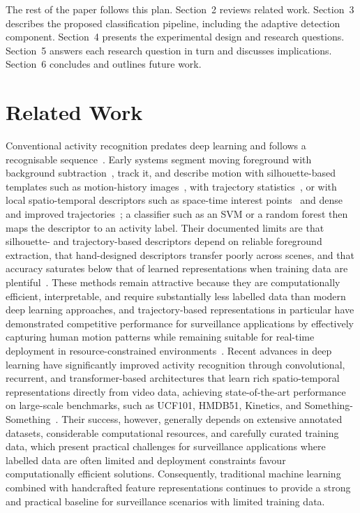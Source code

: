 \documentclass[runningheads]{llncs}
\begin{document}
The rest of the paper follows this plan. Section~2 reviews related work. Section~3 
describes the proposed classification pipeline, including the adaptive detection 
component. Section~4 presents the experimental design and research questions. 
Section~5 answers each research question in turn and discusses implications. 
Section~6 concludes and outlines future work.

\section{Related Work}

Conventional activity recognition predates deep learning and follows a recognisable 
sequence~\cite{aggarwal2011human,poppe2010survey}. Early systems segment moving 
foreground with background subtraction~\cite{stauffer1999adaptive,zivkovic2004improved}, 
track it, and describe motion with silhouette-based templates such as motion-history 
images~\cite{bobick2002recognition}, with trajectory statistics~\cite{ahmed2018trajectory}, 
or with local spatio-temporal descriptors such as space-time interest 
points~\cite{laptev2005space} and dense and improved 
trajectories~\cite{wang2012dense,wang2013improved}; a classifier such as an SVM or a 
random forest then maps the descriptor to an activity label. Their documented limits are 
that silhouette- and trajectory-based descriptors depend on reliable foreground 
extraction, that hand-designed descriptors transfer poorly across scenes, and that 
accuracy saturates below that of learned representations when training data are 
plentiful~\cite{ur2023use,xiao2016overview}. These methods 
remain attractive because they are computationally efficient, interpretable, and require 
substantially less labelled data than modern deep learning approaches, and trajectory-based 
representations in particular have demonstrated competitive performance for surveillance 
applications by effectively capturing human motion patterns while remaining suitable for 
real-time deployment in resource-constrained environments~\cite{ahmed2018trajectory,csurka2018handcrafted}. 
Recent advances in deep learning have significantly improved activity recognition through 
convolutional, recurrent, and transformer-based architectures that learn rich spatio-temporal 
representations directly from video data, achieving state-of-the-art performance on large-scale 
benchmarks, such as UCF101, HMDB51, Kinetics, and Something-Something~\cite{ur2023use,xiao2016overview}. 
Their success, however, generally depends on extensive annotated datasets, considerable computational 
resources, and carefully curated training data, which present practical challenges for surveillance 
applications where labelled data are often limited and deployment constraints favour computationally 
efficient solutions. Consequently, traditional machine learning combined with handcrafted feature 
representations continues to provide a strong and practical baseline for surveillance scenarios 
with limited training data.
\end{document}
